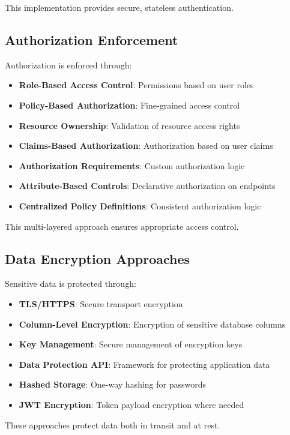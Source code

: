 This implementation provides secure, stateless authentication.

\subsection{Authorization Enforcement}
Authorization is enforced through:
\begin{itemize}
    \item \textbf{Role-Based Access Control}: Permissions based on user roles
    \item \textbf{Policy-Based Authorization}: Fine-grained access control
    \item \textbf{Resource Ownership}: Validation of resource access rights
    \item \textbf{Claims-Based Authorization}: Authorization based on user claims
    \item \textbf{Authorization Requirements}: Custom authorization logic
    \item \textbf{Attribute-Based Controls}: Declarative authorization on endpoints
    \item \textbf{Centralized Policy Definitions}: Consistent authorization logic
\end{itemize}

This multi-layered approach ensures appropriate access control.

\subsection{Data Encryption Approaches}
Sensitive data is protected through:
\begin{itemize}
    \item \textbf{TLS/HTTPS}: Secure transport encryption
    \item \textbf{Column-Level Encryption}: Encryption of sensitive database columns
    \item \textbf{Key Management}: Secure management of encryption keys
    \item \textbf{Data Protection API}: Framework for protecting application data
    \item \textbf{Hashed Storage}: One-way hashing for passwords
    \item \textbf{JWT Encryption}: Token payload encryption where needed
\end{itemize}

These approaches protect data both in transit and at rest.

